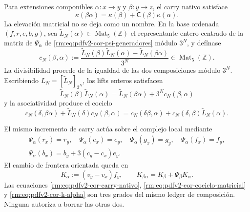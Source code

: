 Para extensiones componibles \(\alpha:x\to y\) y \(\beta:y\to z\), el
carry nativo satisface
\begin{equation}
\label{rm:eq:pdfv2-cor-carry-nativo}
 \kappa(\beta\alpha)=
 \kappa(\beta)+\mathsf C(\beta)\kappa(\alpha).
\end{equation}
La elevación matricial no se deja como un nombre. En la base ordenada
\((f,r,e,b,g)\), sea
\(\widetilde L_N(\alpha)\in\operatorname{Mat}_5(\mathbb Z)\) el
representante entero centrado de la matriz de
\(\Psi_\alpha\) de \eqref{rm:eq:pdfv2-cor-psi-generadores} módulo \(3^N\), y
defínase
\begin{equation}
\label{rm:eq:pdfv2-cor-carry-matricial-def}
 c_N(\beta,\alpha):=
 \frac{\widetilde L_N(\beta)\widetilde L_N(\alpha)
       -\widetilde L_N(\beta\alpha)}{3^N}
 \in\operatorname{Mat}_5(\mathbb Z).
\end{equation}
La divisibilidad procede de la igualdad de las dos composiciones módulo
\(3^N\). Escribiendo \(L_N=[\widetilde L_N]_{3^N}\), los lifts enteros
satisfacen
\begin{equation}
\label{rm:eq:pdfv2-cor-carry-matricial}
 \widetilde L_N(\beta)\widetilde L_N(\alpha)
 =\widetilde L_N(\beta\alpha)+3^Nc_N(\beta,\alpha)
\end{equation}
y la asociatividad produce el cociclo
\begin{equation}
\label{rm:eq:pdfv2-cor-cociclo-matricial}
 c_N(\delta,\beta\alpha)+\widetilde L_N(\delta)c_N(\beta,\alpha)
 =c_N(\delta\beta,\alpha)
  +c_N(\delta,\beta)\widetilde L_N(\alpha).
\end{equation}

El mismo incremento de carry actúa sobre el complejo local mediante
\begin{equation}
\label{rm:eq:pdfv2-cor-psi-generadores}
 \begin{gathered}
 \Psi_\alpha(r_x)=r_y,\quad
 \Psi_\alpha(e_x)=e_y,\quad
 \Psi_\alpha(g_x)=g_y,\quad
 \Psi_\alpha(f_x)=f_y,\\
 \Psi_\alpha(b_x)=b_y+3(c_y-c_x)e_y.
 \end{gathered}
\end{equation}
El cambio de frontera orientada queda en
\begin{equation}
\label{rm:eq:pdfv2-cor-k-alpha}
 K_\alpha:=(v_y-v_x)f_y,
 \qquad
 K_{\beta\alpha}=K_\beta+\Psi_\beta K_\alpha.
\end{equation}
Las ecuaciones \eqref{rm:eq:pdfv2-cor-carry-nativo},
\eqref{rm:eq:pdfv2-cor-cociclo-matricial} y
\eqref{rm:eq:pdfv2-cor-k-alpha} son tres grados del mismo ledger de composición.
Ninguna autoriza a borrar las otras dos.

